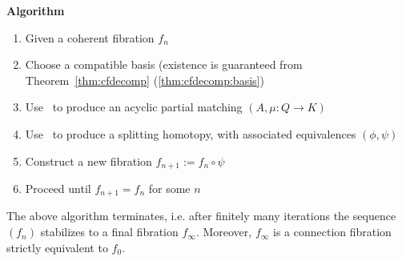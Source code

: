 {\bf Algorithm}
\begin{enumerate}
\item Given a coherent fibration $f_n$
\item Choose a compatible basis (existence is guaranteed from Theorem~\ref{thm:cfdecomp} (\ref{thm:cfdecomp:basis})
\item Use~\cite[Algorithm 3.6]{focm} to produce an acyclic partial matching $(A,\mu:Q\to K)$
\item Use~\cite[Algorithm 3.12]{focm} to produce a splitting homotopy, with associated equivalences $(\phi,\psi)$
\item Construct a new fibration $f_{n+1}:=f_n\circ \psi$
\item Proceed until $f_{n+1}=f_n$ for some $n$
\end{enumerate}

\begin{prop}
 The above algorithm terminates, i.e. after finitely many iterations the sequence $(f_n)$ stabilizes to a final fibration $f_\infty$.  Moreover, $f_\infty$ is a connection fibration strictly equivalent to $f_0$.
\end{prop}













